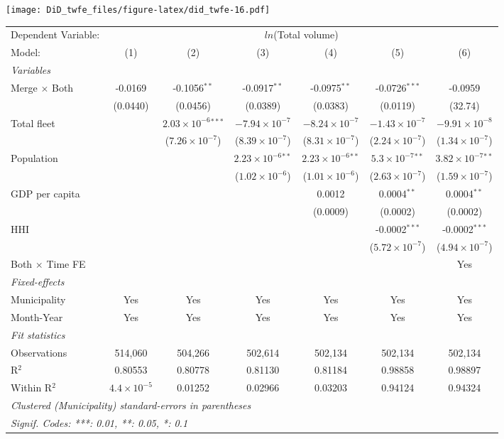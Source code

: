 \documentclass[
]{article}
\begin{document}
\texttt{[image: DiD\_twfe\_files/figure-latex/did\_twfe-16.pdf]}

\begin{tabular}{lcccccc}
\tabularnewline\midrule\midrule
Dependent Variable:&\multicolumn{6}{c}{$ln$(Total volume)}\\
Model:&(1) & (2) & (3) & (4) & (5) & (6)\\
\midrule \emph{Variables}&   &   &   &   &   &  \\
Merge $\times $ Both & -0.0169 & -0.1056$^{**}$ & -0.0917$^{**}$ & -0.0975$^{**}$ & -0.0726$^{***}$ & -0.0959\\
  &(0.0440) & (0.0456) & (0.0389) & (0.0383) & (0.0119) & (32.74)\\
Total fleet &    & $2.03\times 10^{-6}$$^{***}$ & $-7.94\times 10^{-7}$ & $-8.24\times 10^{-7}$ & $-1.43\times 10^{-7}$ & $-9.91\times 10^{-8}$\\
  &   & ($7.26\times 10^{-7}$) & ($8.39\times 10^{-7}$) & ($8.31\times 10^{-7}$) & ($2.24\times 10^{-7}$) & ($1.34\times 10^{-7}$)\\
Population &    &    & $2.23\times 10^{-6}$$^{**}$ & $2.23\times 10^{-6}$$^{**}$ & $5.3\times 10^{-7}$$^{**}$ & $3.82\times 10^{-7}$$^{**}$\\
  &   &    & ($1.02\times 10^{-6}$) & ($1.01\times 10^{-6}$) & ($2.63\times 10^{-7}$) & ($1.59\times 10^{-7}$)\\
GDP per capita &    &    &    & 0.0012 & 0.0004$^{**}$ & 0.0004$^{**}$\\
  &   &    &    & (0.0009) & (0.0002) & (0.0002)\\
HHI &    &    &    &    & -0.0002$^{***}$ & -0.0002$^{***}$\\
  &   &    &    &    & ($5.72\times 10^{-7}$) & ($4.94\times 10^{-7}$)\\
Both $\times$ Time FE &  &  &  &  &  & Yes\\
\midrule \emph{Fixed-effects}&   &   &   &   &   &  \\
Municipality & Yes & Yes & Yes & Yes & Yes & Yes\\
Month-Year & Yes & Yes & Yes & Yes & Yes & Yes\\
\midrule \emph{Fit statistics}&  & & & & & \\
Observations & 514,060&504,266&502,614&502,134&502,134&502,134\\
R$^2$ & 0.80553&0.80778&0.81130&0.81184&0.98858&0.98897\\
Within R$^2$ & $4.4\times 10^{-5}$&0.01252&0.02966&0.03203&0.94124&0.94324\\
\midrule\midrule\multicolumn{7}{l}{\emph{Clustered (Municipality) standard-errors in parentheses}}\\
\multicolumn{7}{l}{\emph{Signif. Codes: ***: 0.01, **: 0.05, *: 0.1}}\\
\end{tabular}
\end{document}
